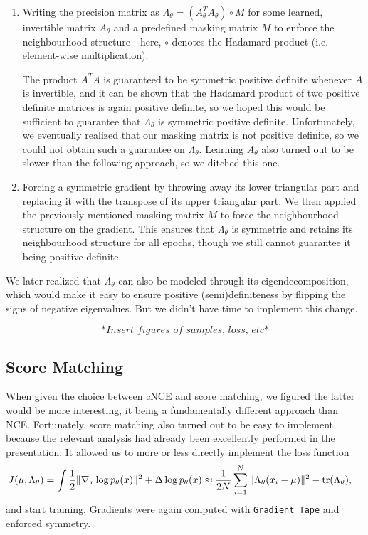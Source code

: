 \documentclass[a4paper]{article}
\theoremstyle{definition}
\theoremstyle{plain}
\begin{document}
\begin{enumerate}
\item Writing the precision matrix as $\Lambda_\theta = (A_\theta ^T A_\theta) \circ M$ for some learned, invertible matrix $A_\theta$ and a pre\-defined masking matrix $M$ to enforce the neighbourhood structure - here, $\circ$ denotes the Hadamard product (i.e. element-wise multiplication).

The product $A^T A$ is guaranteed to be symmetric positive definite whenever $A$ is invertible, and it can be shown that the Hadamard product of two positive definite matrices is again positive definite, so we hoped this would be sufficient to guarantee that $\Lambda_\theta$ is symmetric positive definite. Unfortunately, we eventually realized that our masking matrix is not positive definite, so we could not obtain such a guarantee on $\Lambda_\theta$. Learning $A_\theta$ also turned out to be slower than the following approach, so we ditched this one.

\item Forcing a symmetric gradient by throwing away its lower triangular part and replacing it with the transpose of its upper triangular part. We then applied the previously mentioned masking matrix $M$ to force the neighbourhood structure on the gradient. This ensures that $\Lambda_\theta$ is symmetric and retains its neighbourhood structure for all epochs, though we still cannot guarantee it being positive definite.
\end{enumerate}
We later realized that $\Lambda_\theta$ can also be modeled through its eigendecomposition, which would make it easy to ensure positive (semi)definiteness by flipping the signs of negative eigenvalues. But we didn't have time to implement this change.

$$\textit{*Insert figures of samples, loss, etc*}$$

\subsection*{Score Matching}

When given the choice between cNCE and score matching, we figured the latter would be more interesting, it being a fundamentally different approach than NCE. Fortunately, score matching also turned out to be easy to implement because the relevant analysis had already been excellently performed in the presentation. It allowed us to more or less directly implement the loss function
\begin{alignat*}{1}
J(\mu,\Lambda_\theta) &= \int \frac{1}{2} \|\nabla_x \log p_\theta(x)\|^2 + \Delta \log p_\theta(x) \approx \frac{1}{2N} \sum_{i=1}^N \| \Lambda_\theta (x_i - \mu)\|^2 - \tr(\Lambda_\theta),
\end{alignat*}
and start training. Gradients were again computed with \texttt{Gradient Tape} and enforced symmetry.
\end{document}
